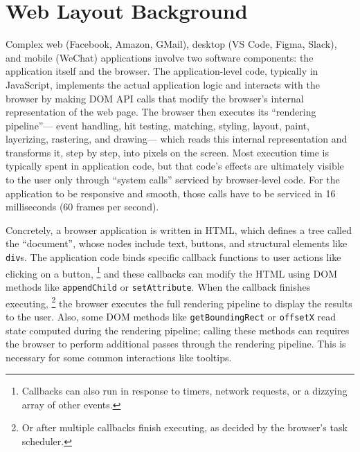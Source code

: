\section{Web Layout Background}

Complex
  web (Facebook, Amazon, GMail),
  desktop (VS Code, Figma, Slack),
  and mobile (WeChat) applications
  involve two software components:
  the application itself and the browser.
The application-level code, typically in JavaScript,
  implements the actual application logic and
  interacts with the browser by making DOM API calls
  that modify the browser's internal representation of the web page.
The browser then executes its ``rendering pipeline''---%
  event handling, hit testing, matching, styling,
  layout, paint, layerizing, rastering, and drawing---%
  which reads this internal representation and transforms it,
  step by step, into pixels on the screen.
Most execution time is typically spent in application code,
  but that code's effects are ultimately visible to the user
  only through ``system calls'' serviced by browser-level code.
For the application to be responsive and smooth,
  those calls have to be serviced
  in 16 milliseconds (60 frames per second).

Concretely, a browser application is written in HTML,
  which defines a tree called the ``document'',
  whose nodes include text, buttons,
  and structural elements like \texttt{div}s.
The application code binds specific callback functions
  to user actions like clicking on a button,%
  \footnote{Callbacks can also run in response to
    timers, network requests, or a dizzying array of
    other events.}
  and these callbacks can modify the HTML using DOM methods
  like \texttt{appendChild} or \texttt{setAttribute}.
When the callback finishes executing,%
\footnote{Or after multiple callbacks finish executing,
  as decided by the browser's task scheduler.}
  the browser executes the full rendering pipeline
  to display the results to the user.
Also, some DOM methods like
  \texttt{getBoundingRect} or \texttt{offsetX}
  read state computed during the rendering pipeline;
  calling these methods can requires the browser
  to perform additional passes through the rendering pipeline.
This is necessary for some common interactions like tooltips.


